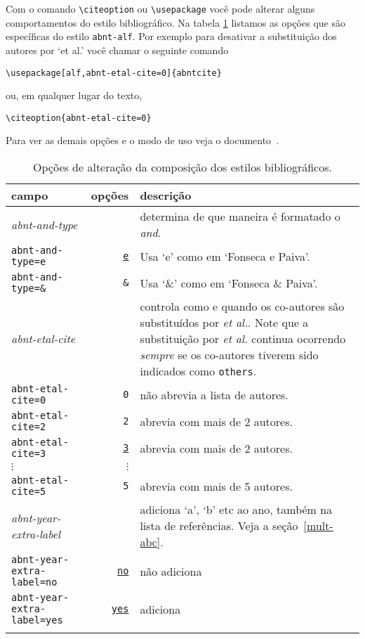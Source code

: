 \documentclass[espacosimples]{abnt}
\begin{document}
Com o comando \verb+\citeoption+ ou \verb+\usepackage+ você pode alterar alguns comportamentos
do estilo bibliográfico. Na tabela \ref{tabela-opcoes} listamos as
opções que são específicas do estilo {\tt abnt-alf}. 
Por exemplo para desativar a substituição dos autores por `et al.'
você chamar o seguinte comando
\begin{verbatim}
\usepackage[alf,abnt-etal-cite=0]{abntcite}
\end{verbatim}
ou, em qualquer lugar do texto,
\begin{verbatim}
\citeoption{abnt-etal-cite=0}
\end{verbatim}
Para ver as demais
opções e o modo de uso veja o documento~\cite{abnt-bibtex-doc}.

\begin{table}[htbp]
\begin{center}
\begin{tabular}{lrp{8cm}}\hline\hline
campo & opções & descrição \\ \hline
\emph{abnt-and-type} & & determina de que maneira é formatado o \emph{and}.\\
{\tt abnt-and-type=e} & \underline{\tt e}& Usa `e' como em `Fonseca e Paiva'.\\
{\tt abnt-and-type=\&} & {\tt \&} & Usa `\&' como em `Fonseca \& Paiva'.
\\ \hline
\emph{abnt-etal-cite} &  & controla como e quando os co-autores são
substituídos por \emph{et al.}.  Note que a substituição
por \emph{et al.} continua ocorrendo \emph{sempre} se os co-autores tiverem sido indicados
como {\tt others}.\\
{\tt abnt-etal-cite=0}&{\tt 0}& não abrevia a lista de autores.\\
{\tt abnt-etal-cite=2}& {\tt 2} & abrevia com mais de 2 autores.\\
{\tt abnt-etal-cite=3}& \underline{\tt 3} & abrevia com mais de 2 autores.\\
$\vdots$ & $\vdots$ & \\
{\tt abnt-etal-cite=5}& {\tt 5} & abrevia com mais de 5 autores.
\\ \hline
\emph{abnt-year-extra-label} && adiciona `a', `b' etc ao ano, também na lista de referências.
Veja a seção~\ref{mult-abc}.\\
{\tt abnt-year-extra-label=no}& \underline{\tt no} & não adiciona \\
{\tt abnt-year-extra-label=yes}& \underline{\tt yes} & adiciona \\
\\ \hline\hline
\end{tabular}
\end{center}
\caption[Opções de alteração dos estilos bibliográficos: composição]{
Opções de alteração da composição dos estilos bibliográficos.}
\label{tabela-opcoes}
\end{table}
\end{document}
